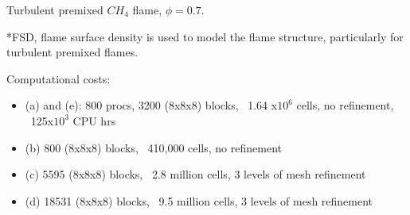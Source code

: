 \documentclass{beamer}
\begin{document}
\begin{frame}
\begin{minipage}[t][1\textheight]{1\textwidth}
\begin{exampleblock}{Turbulent premixed $CH_4$ flame, $\phi=0.7$. }
\begin{figure}
\end{figure}
\vspace{5pt}
\tiny{*FSD, flame surface density is used to model the flame structure, particularly for turbulent premixed flames.}
\vspace{10pt}

Computational costs:
\begin{itemize}
\tiny
\item (a) and (e): 800 procs, 3200 (8x8x8) blocks, ~1.64 x$10^6$ cells, no refinement, ~125x$10^3$ CPU hrs 
\item (b) 800 (8x8x8) blocks, ~410,000 cells,  no refinement
\item (c) 5595 (8x8x8) blocks, ~2.8 million cells, 3 levels of mesh refinement
\item (d) 18531 (8x8x8) blocks, ~9.5 million cells, 3 levels of mesh refinement
\end{itemize}

\end{exampleblock}
\end{minipage}


\end{frame}

\end{document}
